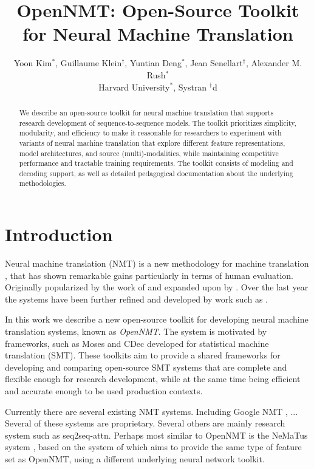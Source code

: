 \documentclass[11pt]{article}
\title{OpenNMT: Open-Source Toolkit for Neural Machine Translation}
\author{Yoon Kim$^*$, Guillaume Klein$^\dagger$, Yuntian Deng$^*$, Jean Senellart$^\dagger$, Alexander M. Rush$^*$ \\ Harvard University$^*$, Systran $^\dagger$d}
\date{}
\begin{document}
\maketitle
\begin{abstract}

  We describe an open-source toolkit for neural machine translation
  that supports research development of sequence-to-sequence models.
  The toolkit prioritizes simplicity, modularity, and efficiency to
  make it reasonable for researchers to experiment with variants of
  neural machine translation that explore different feature
  representations, model architectures, and source (multi)-modalities,
  while maintaining competitive performance and tractable training
  requirements. The toolkit consists of modeling and decoding support,
  as well as detailed pedagogical documentation about the underlying
  methodologies.

\end{abstract}

\section{Introduction}


Neural machine translation (NMT) is a new methodology for machine
translation \cite{}, that has shown remarkable gains particularly in
terms of human evaluation. Originally popularized by the work of
\cite{} and expanded upon by \cite{}. Over the last year the systems
have been further refined and developed by work such as \cite{}.

In this work we describe a new open-source toolkit for developing
neural machine translation systems, known as \textit{OpenNMT}. The
system is motivated by frameworks, such as Moses and CDec developed
for statistical machine translation (SMT). These toolkits aim to
provide a shared frameworks for developing and comparing open-source
SMT systems that are complete and flexible enough for research
development, while at the same time being efficient and accurate
enough to be used production contexts. 


Currently there are several existing NMT systems. Including Google NMT
\cite{}, ... Several of these systems are proprietary. Several others
are mainly research system such as seq2seq-attn. Perhaps most similar
to OpenNMT is the NeMaTus system \cite{}, based on the system of \cite{}
which aims to provide the same type of feature set as OpenNMT, using a
different underlying neural network toolkit.
\end{document}

